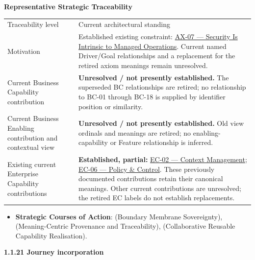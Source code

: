 \par\medskip\textbf{Representative Strategic Traceability}\par


\begin{longtable}{>{\raggedright\arraybackslash}p{}>{\raggedright\arraybackslash}p{}}
Traceability level & Current architectural standing \\
Motivation & Established existing constraint: \hyperref[element:5de2ae2c3b794c2d9f3a14efd51d564f]{AX-07 — Security Is Intrinsic to Managed Operations}. Current named Driver/Goal relationships and a replacement for the retired axiom meanings remain unresolved. \\
Current Business Capability contribution & \textbf{Unresolved / not presently established.} The superseded BC relationships are retired; no relationship to BC-01 through BC-18 is supplied by identifier position or similarity. \\
Current Business Enabling contribution and contextual view & \textbf{Unresolved / not presently established.} Old view ordinals and meanings are retired; no enabling-capability or Feature relationship is inferred. \\
Existing current Enterprise Capability contributions & \textbf{Established, partial:} \href{\detokenize{../../../../../docs/markdown/02-strategy/capabilities/enterprise-capabilities.md#ec-02-context-management}}{EC-02 — Context Management}; \href{\detokenize{../../../../../docs/markdown/02-strategy/capabilities/enterprise-capabilities.md#ec-06-policy--control}}{EC-06 — Policy \& Control}. These previously documented contributions retain their canonical meanings. Other current contributions are unresolved; the retired EC labels do not establish replacements. \\
\end{longtable}


\begin{itemize}


\item \textbf{Strategic Courses of Action}: \texttt{} (Boundary Membrane Sovereignty), \texttt{} (Meaning-Centric Provenance and Traceability), \texttt{} (Collaborative Reusable Capability Realisation).

\end{itemize}


\par\medskip\textbf{1.1.21 Journey incorporation}\par


